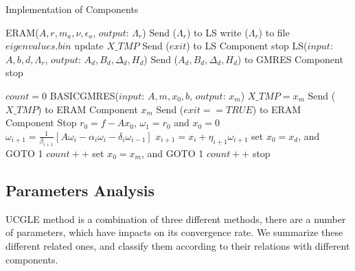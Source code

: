 \begin{breakablealgorithm}
	\caption{Implementation of Components}   
	\label{alg:gmres/ls-a}   
	\begin{algorithmic}[1]
		\State ERAM($A, r, m_a, \nu,\epsilon_a$, $output$: $\Lambda_r$)
		\State Send ($\Lambda_r$) to LS
		\State write ($\Lambda_r$) to file $eigenvalues.bin$\EndIf
		\State update $X\_TMP$\EndIf
		\State Send ($exit$) to LS Component  \State stop \EndIf
		\EndWhile
		\EndFunction
		\State LS{($input$: $A,b,d,\Lambda_r$, $output$: $A_d, B_d, \Delta_d, H_d$)}
		\State Send ($A_d, B_d, \Delta_d, H_d$) to GMRES Component
		\EndIf
		\State stop \EndIf
		\EndFunction
		
		\State $count=0$
		\State BASICGMRES{($input$: $A, m, x_0,b$, $output$: $x_m$)}
		\State $X\_TMP = x_m$
		\State Send ($X\_TMP$) to ERAM Component
		\State \Return $x_m$
		\State Send ($exit==TRUE$) to ERAM Component
		\State Stop
		\Else {}
		\State $r_0=f-Ax_0$, $\omega_1 = r_0$ and $x_0=0$
		\State $\omega_{i+1}=\frac{1}{\beta_{i+1}}[A\omega_i-\alpha_i\omega_i-\delta_i\omega_{i-1}]$
		\State $x_{i+1}=x_i+\eta_{i+1}\omega_{i+1}$
		\EndFor
		\EndFor
		\State set $x_0=x_d$, and GOTO 1
		\State $count++$
		\EndIf
		\Else
		\State set $x_0=x_m$, and GOTO 1
		\State $count++$
		\EndIf
		\EndIf
		\State stop \EndIf
		\EndFunction
	\end{algorithmic}  
\end{breakablealgorithm}


\subsection{Parameters Analysis} \label{parameter analysis}

UCGLE method is a combination of three different methods, there are a number of parameters, which have impacts on its convergence rate. We summarize these different related ones, and classify them according to their relations with different components.

